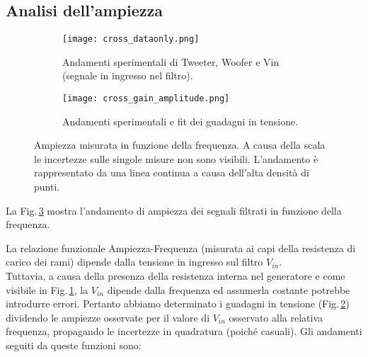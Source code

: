 \documentclass[../Relazione_circuiti]{subfiles}
\begin{document}
\subsection{Analisi dell'ampiezza}

  \begin{figure}[H]
    \centering

    \begin{subfigure}[t]{=0.49\textwidth}

      \texttt{[image: cross\_dataonly.png]}

      \caption{Andamenti sperimentali di Tweeter, Woofer e Vin (segnale in ingresso nel filtro).}
      \label{fig: amplitude_dataonly}

    \end{subfigure}
    \hfill
    \begin{subfigure}[t]{=0.49\textwidth}

      \texttt{[image: cross\_gain\_amplitude.png]}

      \caption
      {Andamenti sperimentali e fit dei guadagni in tensione.}
      \label{fig:cross_gain}
    \end{subfigure}

    \caption{
      Ampiezza misurata in funzione della frequenza.
      A causa della scala le incertezze sulle singole misure non sono visibili.
      L'andamento è rappresentato da una linea continua a causa dell'alta densità di punti.
    }

    \label{fig:cross_amplitude}

  \end{figure}

  La Fig.\,\ref{fig:cross_amplitude} mostra l'andamento di ampiezza dei segnali filtrati in funzione della frequenza.

  La relazione funzionale Ampiezza-Frequenza (misurata ai capi della resistenza di carico dei rami) dipende
  dalla tensione in ingresso sul filtro $V_{in}$. \\
  Tuttavia, a causa della presenza della resistenza interna nel generatore e come visibile in
  Fig.\,\ref{fig: amplitude_dataonly}, la $V_{in}$
  dipende dalla frequenza ed assumerla costante potrebbe introdurre errori.
  Pertanto abbiamo determinato i guadagni in tensione (Fig.\,\ref{fig:cross_gain}) dividendo le ampiezze osservate per
  il valore di $V_{in}$
  osservato alla relativa frequenza, propagando le incertezze in quadratura (poiché casuali).
  Gli andamenti seguiti da queste funzioni sono:
\end{document}
